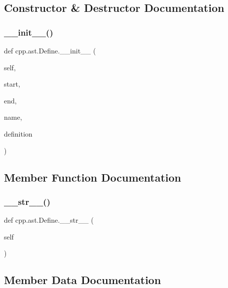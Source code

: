 \subsection{Constructor \& Destructor Documentation}
\mbox{\label{classcpp_1_1ast_1_1_define_ae9af61866e010a863ba9f8818ec8924c}} 
\subsubsection{\texorpdfstring{\_\_init\_\_()}{\_\_init\_\_()}}
{\footnotesize\ttfamily def cpp.\+ast.\+Define.\+\_\+\+\_\+init\+\_\+\+\_\+ (\begin{DoxyParamCaption}\item[{}]{self,  }\item[{}]{start,  }\item[{}]{end,  }\item[{}]{name,  }\item[{}]{definition }\end{DoxyParamCaption})}



\subsection{Member Function Documentation}
\mbox{\label{classcpp_1_1ast_1_1_define_aa89732914b19901c8d291e11f34bb627}} 
\subsubsection{\texorpdfstring{\_\_str\_\_()}{\_\_str\_\_()}}
{\footnotesize\ttfamily def cpp.\+ast.\+Define.\+\_\+\+\_\+str\+\_\+\+\_\+ (\begin{DoxyParamCaption}\item[{}]{self }\end{DoxyParamCaption})}



\subsection{Member Data Documentation}
\mbox{\label{classcpp_1_1ast_1_1_define_a0c636652dfeb2f15e62793afea1153c9}} 
